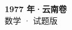 \documentclass[zihao=-4, a4paper]{ctexart}
\begin{document}
\begin{center}
  {\Large\bfseries 1977 年·云南卷}\\[4pt]
  {\large 数学 · 试题版}
\end{center}
\medskip
{}

\end{document}
